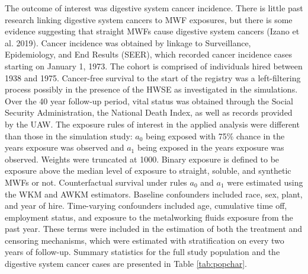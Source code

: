 \documentclass[
  11pt,
]{article}
\begin{document}
The outcome of interest was digestive system cancer incidence. There is
little past research linking digestive system cancers to MWF exposures,
but there is some evidence suggesting that straight MWFs cause digestive
system cancers (Izano et al. 2019). Cancer incidence was obtained by
linkage to Surveillance, Epidemiology, and End Results (SEER), which
recorded cancer incidence cases starting on January 1, 1973. The cohort
is comprised of individuals hired between 1938 and 1975. Cancer-free
survival to the start of the registry was a left-filtering process
possibly in the presence of the HWSE as investigated in the simulations.
Over the 40 year follow-up period, vital status was obtained through the
Social Security Administration, the National Death Index, as well as
records provided by the UAW. The exposure rules of interest in the
applied analysis were different than those in the simulation study:
\(a_0\) being exposed with 75\% chance in the years exposure was
observed and \(a_1\) being exposed in the years exposure was observed.
Weights were truncated at 1000. Binary exposure is defined to be
exposure above the median level of exposure to straight, soluble, and
synthetic MWFs or not. Counterfactual survival under rules \(a_0\) and
\(a_1\) were estimated using the WKM and AWKM estimators. Baseline
confounders included race, sex, plant, and year of hire. Time-varying
confounders included age, cumulative time off, employment status, and
exposure to the metalworking fluids exposure from the past year. These
terms were included in the estimation of both the treatment and
censoring mechanisms, which were estimated with stratification on every
two years of follow-up. Summary statistics for the full study population
and the digestive system cancer cases are presented in Table
\ref{tab:popchar}.
\end{document}
